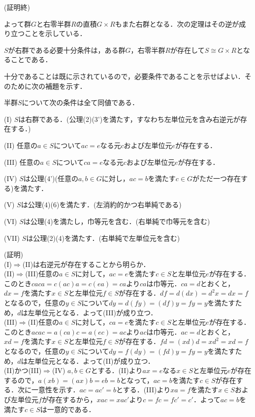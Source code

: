 \begin{flushright}
(証明終)
\end{flushright}
よって群$G$と右零半群$R$の直積$G\times R$もまた右群となる．次の定理はその逆が成り立つことを示している．
\begin{sthm}
$S$が右群である必要十分条件は，ある群$G$，右零半群$R$が存在して$S\cong G\times R$となることである．
\end{sthm}
十分であることは既に示されているので，必要条件であることを示せばよい．そのために次の補題を示す．
\begin{slem}
半群$S$について次の条件は全て同値である．
\begin{description}
\item{(I)} $S$は右群である．(公理(2)(3')を満たす，すなわち左単位元を含み右逆元が存在する．)
\item{(II)} 任意の$a\in S$について$ac=e$なる元$c$および左単位元$e$が存在する．
\item{(III)} 任意の$a\in S$について$ca=e$なる元$c$および左単位元$e$が存在する．
\item{(IV)} $S$は公理(4')(任意の$a,b\in G$に対し，$ac=b$を満たす$c\in G$がただ一つ存在する)を満たす．
\item{(V)} $S$は公理(4)(6)を満たす．(左消約的かつ右単純である)
\item{(VI)} $S$は公理(4)を満たし，巾等元を含む．(右単純で巾等元を含む)
\item{(VII)} $S$は公理(2)(4)を満たす．(右単純で左単位元を含む)
\end{description}
\end{slem}
(証明)\\
(I)$\Rightarrow$(II)は右逆元が存在することから明らか．\\
(II)$\Rightarrow$(III)任意の$a\in S$に対して，$ac=e$を満たす$c\in S$と左単位元$e$が存在する．このとき$caca=c(ac)a=c(ea)=ca$より$ca$は巾等元．$ca=d$とおくと，$dx=f$を満たす$x\in S$と左単位元$f\in S$が存在する．$df=d(dx)=d^2x=dx=f$となるので，任意の$y\in S$について$dy=d(fy)=(df)y=fy=y$を満たすため，$d$は左単位元となる．よって(III)が成り立つ．\\
(III)$\Rightarrow$(II)任意の$a\in S$に対して，$ca=e$を満たす$c\in S$と左単位元$e$が存在する．このとき$acac=a(ca)c=a(ec)=ac$より$ac$は巾等元．$ac=d$とおくと，$xd=f$を満たす$x\in S$と左単位元$f\in S$が存在する．$fd=(xd)d=xd^2=xd=f$となるので，任意の$y\in S$について$dy=f(dy)=(fd)y=fy=y$を満たすため，$d$は左単位元となる．よって(II)が成り立つ．\\
(II)かつ(III)$\Rightarrow$(IV) $a,b\in G$とする．(II)より$ax=e$なる$x\in S$と左単位元$e$が存在するので，$a(xb)=(ax)b=eb=b$となって，$ac=b$を満たす$c\in S$が存在する．次に一意性を示す．$ac=ac'=b$とする．(III)より$xa=f$を満たす$x\in S$および左単位元$f$が存在するから，$xac=xac'$より$c=fc=fc'=c'$．よって$ac=b$を満たす$c\in S$は一意的である．\\
